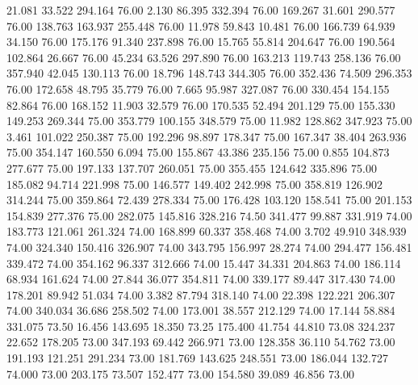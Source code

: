   21.081   33.522  294.164        76.00
   2.130   86.395  332.394        76.00
 169.267   31.601  290.577        76.00
 138.763  163.937  255.448        76.00
  11.978   59.843   10.481        76.00
 166.739   64.939   34.150        76.00
 175.176   91.340  237.898        76.00
  15.765   55.814  204.647        76.00
 190.564  102.864   26.667        76.00
  45.234   63.526  297.890        76.00
 163.213  119.743  258.136        76.00
 357.940   42.045  130.113        76.00
  18.796  148.743  344.305        76.00
 352.436   74.509  296.353        76.00
 172.658   48.795   35.779        76.00
   7.665   95.987  327.087        76.00
 330.454  154.155   82.864        76.00
 168.152   11.903   32.579        76.00
 170.535   52.494  201.129        75.00
 155.330  149.253  269.344        75.00
 353.779  100.155  348.579        75.00
  11.982  128.862  347.923        75.00
   3.461  101.022  250.387        75.00
 192.296   98.897  178.347        75.00
 167.347   38.404  263.936        75.00
 354.147  160.550    6.094        75.00
 155.867   43.386  235.156        75.00
   0.855  104.873  277.677        75.00
 197.133  137.707  260.051        75.00
 355.455  124.642  335.896        75.00
 185.082   94.714  221.998        75.00
 146.577  149.402  242.998        75.00
 358.819  126.902  314.244        75.00
 359.864   72.439  278.334        75.00
 176.428  103.120  158.541        75.00
 201.153  154.839  277.376        75.00
 282.075  145.816  328.216        74.50
 341.477   99.887  331.919        74.00
 183.773  121.061  261.324        74.00
 168.899   60.337  358.468        74.00
   3.702   49.910  348.939        74.00
 324.340  150.416  326.907        74.00
 343.795  156.997   28.274        74.00
 294.477  156.481  339.472        74.00
 354.162   96.337  312.666        74.00
  15.447   34.331  204.863        74.00
 186.114   68.934  161.624        74.00
  27.844   36.077  354.811        74.00
 339.177   89.447  317.430        74.00
 178.201   89.942   51.034        74.00
   3.382   87.794  318.140        74.00
  22.398  122.221  206.307        74.00
 340.034   36.686  258.502        74.00
 173.001   38.557  212.129        74.00
  17.144   58.884  331.075        73.50
  16.456  143.695   18.350        73.25
 175.400   41.754   44.810        73.08
 324.237   22.652  178.205        73.00
 347.193   69.442  266.971        73.00
 128.358   36.110   54.762        73.00
 191.193  121.251  291.234        73.00
 181.769  143.625  248.551        73.00
 186.044  132.727   74.000        73.00
 203.175   73.507  152.477        73.00
 154.580   39.089   46.856        73.00
